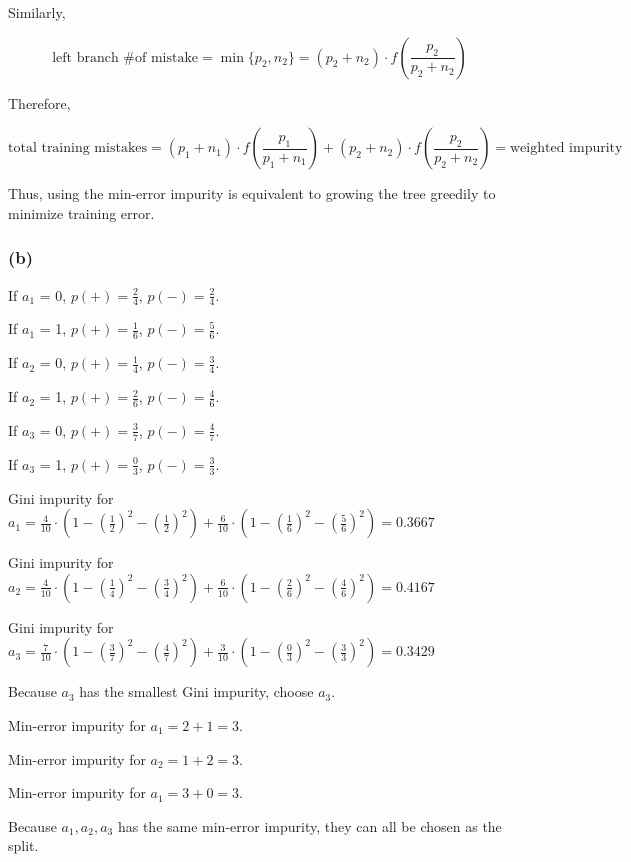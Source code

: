 \documentclass[12pt]{article}
\begin{document}
{Similarly,

\[
\text{left branch \# of mistake} = \min \{p_{2}, n_{2}\} = (p_{2} + n_{2})\cdot f(\frac{p_{2}}{p_{2}+n_{2}})
\]

Therefore,

\[
\text{total training mistakes} = (p_{1} + n_{1})\cdot f(\frac{p_{1}}{p_{1}+n_{1}}) + (p_{2} + n_{2})\cdot f(\frac{p_{2}}{p_{2}+n_{2}}) = \text{weighted impurity}
\]

Thus, using the min-error impurity is equivalent to growing the tree greedily to minimize training error.

\subsubsection*{(b)}
If $a_1$ = 0, $p(+)=\frac{2}{4}$, $p(-)=\frac{2}{4}$.

If $a_1$ = 1, $p(+)=\frac{1}{6}$, $p(-)=\frac{5}{6}$.

If $a_2$ = 0, $p(+)=\frac{1}{4}$, $p(-)=\frac{3}{4}$.

If $a_2$ = 1, $p(+)=\frac{2}{6}$, $p(-)=\frac{4}{6}$.

If $a_3$ = 0, $p(+)=\frac{3}{7}$, $p(-)=\frac{4}{7}$.

If $a_3$ = 1, $p(+)=\frac{0}{3}$, $p(-)=\frac{3}{3}$.

\medskip
Gini impurity for $a_1 = \frac{4}{10}\cdot(1-(\frac{1}{2})^2-(\frac{1}{2})^2)+\frac{6}{10}\cdot(1-(\frac{1}{6})^2-(\frac{5}{6})^2)=0.3667$

\medskip
Gini impurity for $a_2 = \frac{4}{10}\cdot(1-(\frac{1}{4})^2-(\frac{3}{4})^2)+\frac{6}{10}\cdot(1-(\frac{2}{6})^2-(\frac{4}{6})^2)=0.4167$

\medskip
Gini impurity for $a_3 = \frac{7}{10}\cdot(1-(\frac{3}{7})^2-(\frac{4}{7})^2)+\frac{3}{10}\cdot(1-(\frac{0}{3})^2-(\frac{3}{3})^2)=0.3429$

Because $a_3$ has the smallest Gini impurity, choose $a_3$.

\medskip
Min-error impurity for $a_1 = 2 + 1 = 3$.

\medskip
Min-error impurity for $a_2 = 1 + 2 = 3$.

\medskip
Min-error impurity for $a_1 = 3 + 0 = 3$.

Because $a_1,a_2,a_3$ has the same min-error impurity, they can all be chosen as the split.

}
\end{document}
